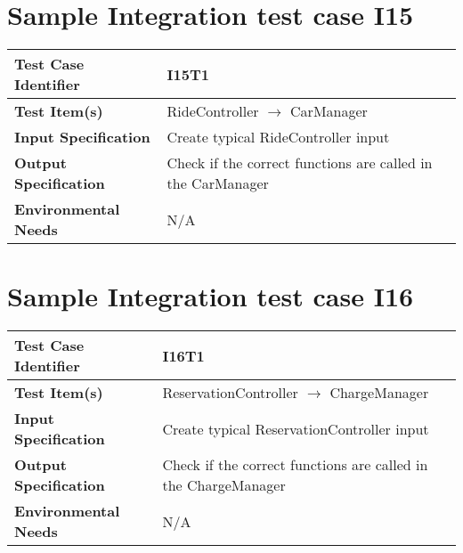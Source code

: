 \section{Sample Integration test case I15}\label{I15}
\begin{center}
	\vspace{0.6cm}
	\begin{tabular}{|l|l|}
		\hline
		\textbf{Test Case Identifier} & I15T1 \bigstrut \\\hline
		\textbf{Test Item(s)} & RideController \ensuremath{\rightarrow} CarManager \bigstrut \\\hline
		\textbf{Input Specification} & Create typical RideController input \bigstrut \\\hline
		\textbf{Output Specification} & Check if the correct functions are called in the CarManager \bigstrut \\\hline
		\textbf{Environmental Needs} & N/A \bigstrut \\\hline
	\end{tabular}
\end{center}

\section{Sample Integration test case I16}\label{I16}
\begin{center}
	\vspace{0.6cm}
	\begin{tabular}{|l|l|}
		\hline
		\textbf{Test Case Identifier} & I16T1 \bigstrut \\\hline
		\textbf{Test Item(s)} & ReservationController \ensuremath{\rightarrow} ChargeManager \bigstrut \\\hline
		\textbf{Input Specification} & Create typical ReservationController input \bigstrut \\\hline
		\textbf{Output Specification} & Check if the correct functions are called in the ChargeManager \bigstrut \\\hline
		\textbf{Environmental Needs} & N/A \bigstrut \\\hline
	\end{tabular}
\end{center}


